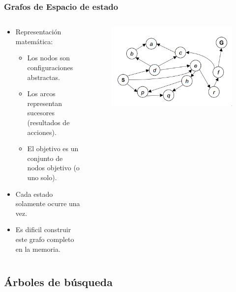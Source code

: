 \documentclass[10pt]{beamer}
\begin{document}
\begin{frame}
  \frametitle{Grafos de Espacio de estado}
  \begin{columns}
    \begin{column}{0.5\textwidth}
      \begin{itemize}
        \item Representación matemática:
          \begin{itemize}
            \item Los nodos son configuraciones abstractas.
            \item Los arcos representan sucesores (resultados de acciones).
            \item El objetivo es un conjunto de nodos objetivo (o uno solo).
          \end{itemize}
        \item Cada estado solamente ocurre una vez.
        \item Es dificil construir este grafo completo en la memoria.
      \end{itemize}
    \end{column}
    \begin{column}{0.5\textwidth}
      \begin{figure}[!h] 
        \centering
        \includegraphics[width=\textwidth]{img/grafo3}
      \end{figure}
    \end{column}
  \end{columns}
\end{frame}


\subsection{Árboles de búsqueda}
\end{document}
